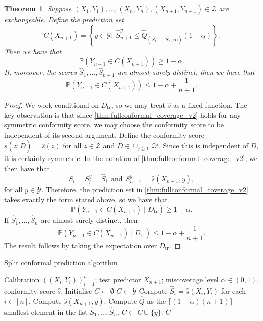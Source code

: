 \documentclass[11pt, titlepage]{article} %
\newcommand{\Prob}[1]{\mathbb{P}\left( #1 \right)}
\numberwithin{equation}{section}
\newtheorem{theorem}{Theorem}
\theoremstyle{definition}
\numberwithin{theorem}{section}
\numberwithin{lemma}{section}
\numberwithin{corollary}{section}
\numberwithin{proposition}{section}
\numberwithin{definition}{section}
\numberwithin{remark}{section}
\begin{document}
\begin{theorem}
    Suppose \((X_1, Y_1), \ldots, (X_n, Y_n), (X_{n+1}, Y_{n+1}) \in \mathcal{Z}\) are exchangeable. Define the prediction set \[
        C(X_{n+1}) = \left\{ y \in \mathcal{Y}: \  \hat{S}_{n+1}^y \leq \hat{Q}_{(\hat{S}_1, \ldots, \hat{S}_n, \infty)}(1-\alpha)  \right\}.
    \] Then we have that \[\Prob{Y_{n+1} \in C(X_{n+1})} \geq 1-\alpha.\] If, moreover, the scores \(\hat{S}_1, \ldots, \hat{S}_{n+1}\) are almost surely distinct, then we have that \[\Prob{Y_{n+1} \in C(X_{n+1})} \leq 1-\alpha + \frac{1}{n+1}.\]
\label{thm:splitconformal_coverage}
\end{theorem}
\begin{proof}
    We work conditional on \(D_\mathrm{tr}\), so we may treat \(\hat{s}\) as a fixed function. The key observation is that since \cref{thm:fullconformal_coverage_v2} holds for any symmetric conformity score, we may choose the conformity score to be independent of its second argument. Define the conformity score \(s(z; \tilde{D}) = \hat{s}(z)\) for all \(z \in \mathcal{Z}\) and \(\tilde{D} \in \cup_{j \geq 1} \mathcal{Z}^j\). Since this is independent of \(\tilde{D}\), it is certainly symmetric. In the notation of \cref{thm:fullconformal_coverage_v2}, we then have that \[S_i = S_i^y = \hat{S}_i \ \ \mathrm{and} \ \ S_{n+1}^y = \hat{s}(X_{n+1}, y),\] for all \(y \in \mathcal{Y}\). Therefore, the prediction set in \cref{thm:fullconformal_coverage_v2} takes exactly the form stated above, so we have that \[\Prob{Y_{n+1} \in C(X_{n+1}) \mid D_{\mathrm{tr}}  } \geq 1-\alpha.\] If \(\hat{S}_1, \ldots, \hat{S}_n\) are almost surely distinct, then \[\Prob{Y_{n+1} \in C(X_{n+1}) \mid D_{\mathrm{tr}}  } \leq 1-\alpha + \frac{1}{n+1}.\] The result follows by taking the expectation over \(D_\mathrm{tr}.\)
\end{proof}

\begin{algorithm}[H]
\caption{Split conformal prediction algorithm}
\begin{algorithmic}
    \Require Calibration \(((X_i, Y_i))_{i=1}^n\); test predictor \(X_{n+1}\); miscoverage level \(\alpha \in (0,1)\), conformity score \(\hat{s}\).
    \State Initialise \(C \gets \emptyset\)
        \State \(C \gets \mathcal{Y}\)
    \Else
        \State Compute \(\hat{S}_i = \hat{s}(X_i,Y_i)\) for each \(i \in [n]\).
            \State Compute \(\hat{s}(X_{n+1}, y)\).
            \State Compute \(\hat{Q}\) as the \(\lceil (1-\alpha)(n+1) \rceil \) smallest element in the list \(\hat{S}_1, \ldots, \hat{S}_n\).
                \State \(C \gets C \cup \{y\} \).
            \EndIf   
        \EndFor
    \EndIf
    \Ensure \(C\)
\end{algorithmic}
\label{alg:split_conformal}
\end{algorithm}
\end{document}
